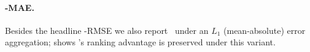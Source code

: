 \paragraph{\ause-MAE.} Besides the headline \ause-RMSE we also report \ause\ under an $L_1$
(mean-absolute) error aggregation;  shows \trustr's ranking advantage is preserved
under this variant.

\begin{table}[h]
\centering\small
{}
\caption{\ause\ under $L_1$ error aggregation (\dn). \trustr\ vs.\ the built-in confidence.}
\label{tab:ausemae}
\end{table}
